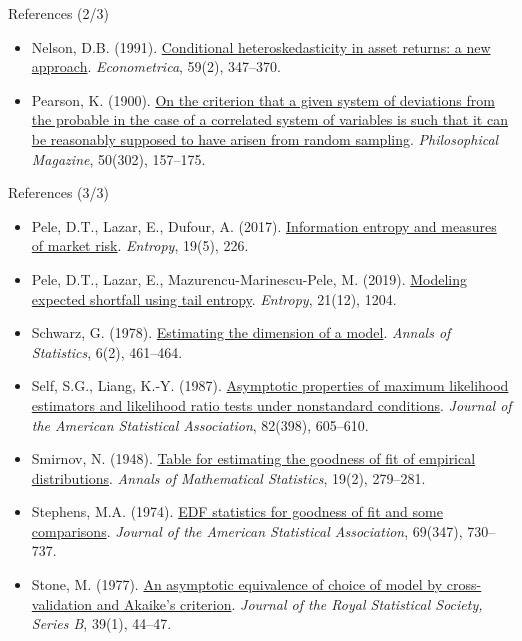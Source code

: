 \begin{frame}{References (2/3)}
\begin{itemize}
    \item Nelson, D.B. (1991). \href{https://doi.org/10.2307/2938260}{Conditional heteroskedasticity in asset returns: a new approach}. \textit{Econometrica}, 59(2), 347--370.
    \item Pearson, K. (1900). \href{https://doi.org/10.1080/14786440009463897}{On the criterion that a given system of deviations from the probable in the case of a correlated system of variables is such that it can be reasonably supposed to have arisen from random sampling}. \textit{Philosophical Magazine}, 50(302), 157--175.
\end{itemize}
\end{frame}

\begin{frame}{References (3/3)}
\itemsize{\tiny}
\begin{itemize}
    \item Pele, D.T., Lazar, E., Dufour, A. (2017). \href{https://doi.org/10.3390/e19050226}{Information entropy and measures of market risk}. \textit{Entropy}, 19(5), 226.
    \item Pele, D.T., Lazar, E., Mazurencu-Marinescu-Pele, M. (2019). \href{https://doi.org/10.3390/e21121204}{Modeling expected shortfall using tail entropy}. \textit{Entropy}, 21(12), 1204.
    \item Schwarz, G. (1978). \href{https://doi.org/10.1214/aos/1176344136}{Estimating the dimension of a model}. \textit{Annals of Statistics}, 6(2), 461--464.
    \item Self, S.G., Liang, K.-Y. (1987). \href{https://doi.org/10.1080/01621459.1987.10478472}{Asymptotic properties of maximum likelihood estimators and likelihood ratio tests under nonstandard conditions}. \textit{Journal of the American Statistical Association}, 82(398), 605--610.
    \item Smirnov, N. (1948). \href{https://doi.org/10.1214/aoms/1177730256}{Table for estimating the goodness of fit of empirical distributions}. \textit{Annals of Mathematical Statistics}, 19(2), 279--281.
    \item Stephens, M.A. (1974). \href{https://doi.org/10.1080/01621459.1974.10480196}{EDF statistics for goodness of fit and some comparisons}. \textit{Journal of the American Statistical Association}, 69(347), 730--737.
    \item Stone, M. (1977). \href{https://doi.org/10.1111/j.2517-6161.1977.tb01603.x}{An asymptotic equivalence of choice of model by cross-validation and Akaike's criterion}. \textit{Journal of the Royal Statistical Society, Series B}, 39(1), 44--47.

\end{itemize}
\end{frame}
